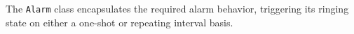 
\label{sec:Alarm}
The {\tt Alarm} class encapsulates the required alarm behavior, triggering
its ringing state on either a one-shot or repeating interval basis.

